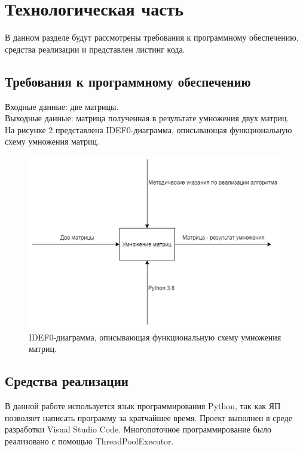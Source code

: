\documentclass[a4paper, 12pt]{article}
\begin{document}
\section{Технологическая часть}
\begin{flushleft}
	\hspace*{5mm} В данном разделе будут рассмотрены требования к программному обеспечению, средства реализации и представлен листинг кода.
	\subsection{Требования к программному обеспечению}
	\hspace*{5mm} Входные данные: две матрицы.
	\\ \hspace*{5mm} Выходные данные: матрица полученная в результате умножения двух матриц.
	\\ \hspace*{5mm} На рисунке 2 представлена IDEF0-диаграмма, описывающая функциональную схему умножения матриц.
	\begin{figure}[h!]
		\centering \includegraphics[scale=0.8]{диаграмма}
		\centering\caption{IDEF0-диаграмма, описывающая функциональную схему умножения матриц.}
	\end{figure}
	\clearpage
	\newpage
	\subsection{Средства реализации}
	\hspace*{5mm} В данной работе используется язык программирования Python, так как ЯП позволяет написать программу за кратчайшее время. Проект выполнен в среде разработки Visual Studio Code. Многопоточное программирование было реализовано с помощью ThreadPoolExecutor. \cite{doc} 

\end{flushleft}
\end{document}
